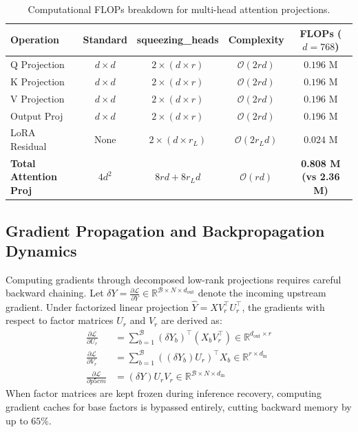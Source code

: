 \begin{table}[H]
\centering
\small
\begin{tabular}{lcccc}
\toprule
\textbf{Operation} & \textbf{Standard} & \textbf{squeezing\_heads} & \textbf{Complexity} & \textbf{FLOPs ($d=768$)} \\
\midrule
Q Projection & $d \times d$ & $2 \times (d \times r)$ & $\mathcal{O}(2rd)$ & $0.196$ M \\
K Projection & $d \times d$ & $2 \times (d \times r)$ & $\mathcal{O}(2rd)$ & $0.196$ M \\
V Projection & $d \times d$ & $2 \times (d \times r)$ & $\mathcal{O}(2rd)$ & $0.196$ M \\
Output Proj & $d \times d$ & $2 \times (d \times r)$ & $\mathcal{O}(2rd)$ & $0.196$ M \\
LoRA Residual & None & $2 \times (d \times r_L)$ & $\mathcal{O}(2r_L d)$ & $0.024$ M \\
\midrule
\textbf{Total Attention Proj} & $4 d^2$ & $8rd + 8r_L d$ & $\mathcal{O}(rd)$ & \textbf{0.808 M (vs 2.36 M)} \\
\bottomrule
\end{tabular}
\caption{Computational FLOPs breakdown for multi-head attention projections.}
\end{table}

\subsection{Gradient Propagation and Backpropagation Dynamics}
Computing gradients through decomposed low-rank projections requires careful backward chaining. Let $\delta Y = \frac{\partial \mathcal{L}}{\partial Y} \in \mathbb{R}^{\mathcal{B} \times N \times d_{\text{out}}}$ denote the incoming upstream gradient. Under factorized linear projection $\hat{Y} = X V_r^\top U_r^\top$, the gradients with respect to factor matrices $U_r$ and $V_r$ are derived as:
\begin{align}
\frac{\partial \mathcal{L}}{\partial U_r} &= \sum_{b=1}^{\mathcal{B}} (\delta Y_b)^\top (X_b V_r^\top) \in \mathbb{R}^{d_{\text{out}} \times r} \\
\frac{\partial \mathcal{L}}{\partial V_r} &= \sum_{b=1}^{\mathcal{B}} ((\delta Y_b) U_r)^\top X_b \in \mathbb{R}^{r \times d_{\text{in}}} \\
\frac{\partial \mathcal{L}}{\partial p{5cm}} &= (\delta Y) U_r V_r \in \mathbb{R}^{\mathcal{B} \times N \times d_{\text{in}}}
\end{align}
When factor matrices are kept frozen during inference recovery, computing gradient caches for base factors is bypassed entirely, cutting backward memory by up to $65\%$.

